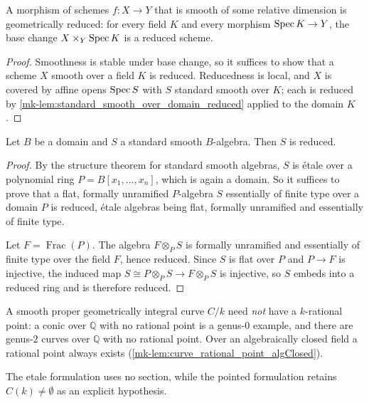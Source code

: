 \begin{lemma}
  \label{mk-lem:smooth_geometrically_reduced}
  \leanok
  A morphism of schemes \(f\colon X\to Y\) that is smooth of some relative
  dimension is geometrically reduced: for every field \(K\) and every morphism
  \(\operatorname{Spec} K\to Y\), the base change \(X\times_Y\operatorname{Spec} K\) is a reduced scheme.
\end{lemma}

\begin{proof}
  \leanok
  Smoothness is stable under base change, so it suffices to show that a scheme
  \(X\) smooth over a field \(K\) is reduced. Reducedness is local, and \(X\) is
  covered by affine opens \(\operatorname{Spec} S\) with \(S\) standard smooth over \(K\); each
  is reduced by \ref{mk-lem:standard_smooth_over_domain_reduced} applied to the
  domain \(K\).
\end{proof}

\begin{lemma}
  \label{mk-lem:standard_smooth_over_domain_reduced}
  \leanok
  Let \(B\) be a domain and \(S\) a standard smooth \(B\)-algebra. Then \(S\) is
  reduced.
\end{lemma}

\begin{proof}
  \leanok
  By the structure theorem for standard smooth algebras, \(S\) is étale over a
  polynomial ring \(P=B[x_1,\dots,x_n]\), which is again a domain. So it suffices
  to prove that a flat, formally unramified \(P\)-algebra \(S\) essentially of
  finite type over a domain \(P\) is reduced, étale algebras being flat, formally
  unramified and essentially of finite type.

  Let \(F=\operatorname{Frac}(P)\). The algebra \(F\otimes_P S\) is formally
  unramified and essentially of finite type over the field \(F\), hence reduced.
  Since \(S\) is flat over \(P\) and \(P\to F\) is injective, the induced map
  \(S\cong P\otimes_P S\to F\otimes_P S\) is injective, so \(S\) embeds into a
  reduced ring and is therefore reduced.
\end{proof}

\begin{remark}
  \label{mk-lem:curve_hypothesis_gap}
  A smooth proper geometrically integral curve \(C/k\) need \emph{not} have a
  \(k\)-rational point: a conic over \(\mathbb{Q}\) with no rational point is a
  genus-\(0\) example, and there are genus-\(2\) curves over \(\mathbb{Q}\) with
  no rational point. Over an algebraically closed field a rational point always
  exists (\ref{mk-lem:curve_rational_point_algClosed}).

  The etale formulation uses no section, while the pointed formulation retains
  \(C(k)\neq\emptyset\) as an explicit hypothesis.
\end{remark}

